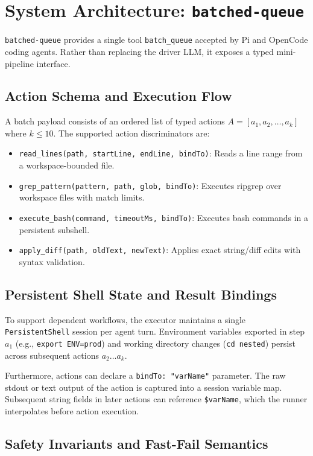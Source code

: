 \documentclass{article}
\begin{document}
\section{System Architecture: \texttt{batched-queue}}

\texttt{batched-queue} provides a single tool \texttt{batch\_queue} accepted by Pi and OpenCode coding agents. Rather than replacing the driver LLM, it exposes a typed mini-pipeline interface.

\subsection{Action Schema and Execution Flow}

A batch payload consists of an ordered list of typed actions $A = [a_1, a_2, \dots, a_k]$ where $k \le 10$. The supported action discriminators are:
\begin{itemize}
    \item \texttt{read\_lines(path, startLine, endLine, bindTo)}: Reads a line range from a workspace-bounded file.
    \item \texttt{grep\_pattern(pattern, path, glob, bindTo)}: Executes ripgrep over workspace files with match limits.
    \item \texttt{execute\_bash(command, timeoutMs, bindTo)}: Executes bash commands in a persistent subshell.
    \item \texttt{apply\_diff(path, oldText, newText)}: Applies exact string/diff edits with syntax validation.
\end{itemize}

\subsection{Persistent Shell State and Result Bindings}

To support dependent workflows, the executor maintains a single \texttt{PersistentShell} session per agent turn. Environment variables exported in step $a_1$ (e.g., \texttt{export ENV=prod}) and working directory changes (\texttt{cd nested}) persist across subsequent actions $a_2 \dots a_k$.

Furthermore, actions can declare a \texttt{bindTo: "varName"} parameter. The raw stdout or text output of the action is captured into a session variable map. Subsequent string fields in later actions can reference \texttt{\${varName}}, which the runner interpolates before action execution.

\subsection{Safety Invariants and Fast-Fail Semantics}
\end{document}
